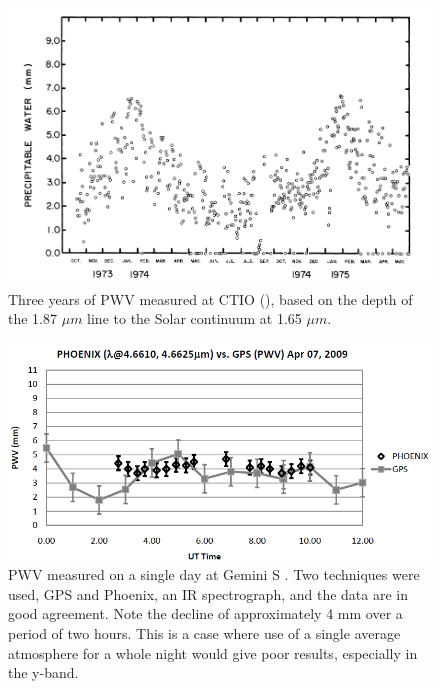 \documentclass[12pt,preprint]{aastex}
\begin{document}
\begin{figure}[htbp]
\includegraphics[width=6in]{AtmoFigs/CTIO_PWV}
\caption{ {Three years of PWV measured at CTIO (\citep{Hansen1975}), based on the depth of the 1.87 $\mu m$ line to the
Solar continuum at 1.65 $\mu m$}.
\label{fig:CTIO_PWV} }
\end{figure}

\begin{figure}[htbp]
\includegraphics[width=6in]{AtmoFigs/GeminiPWV}
\caption{ {PWV measured on a single day at Gemini S \citep{Radomski2010}.  Two
techniques were used, GPS and Phoenix, an IR spectrograph, and the
data are in good agreement.  Note the decline of approximately 4 mm
over a period of two hours.  This is a case where use of a single
average atmosphere for a whole night would give poor results,
especially in the y-band.}
\label{fig:GeminiPWV} }
\end{figure}
\end{document}
